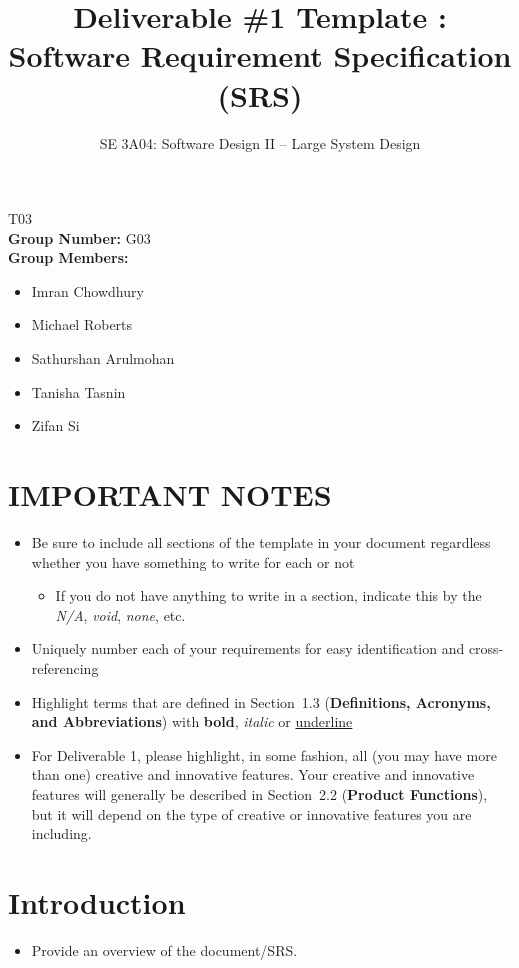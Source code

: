 \documentclass[]{article}
\title{Deliverable \#1 Template : Software Requirement Specification (SRS)}
\author{SE 3A04: Software Design II -- Large System Design}
\date{}
\begin{document}
\maketitle	
{} T03\\
{\bf Group Number:} G03 \\
{\bf Group Members:} 
\begin{itemize}
	\item Imran Chowdhury
	\item Michael Roberts
	\item Sathurshan Arulmohan
	\item Tanisha Tasnin
	\item Zifan Si
\end{itemize}

\section*{IMPORTANT NOTES}
\begin{itemize}
	\item Be sure to include all sections of the template in your document regardless whether you have something to write for each or not
	\begin{itemize}
		\item If you do not have anything to write in a section, indicate this by the \emph{N/A}, \emph{void}, \emph{none}, etc.
	\end{itemize}
	\item Uniquely number each of your requirements for easy identification and cross-referencing
	\item Highlight terms that are defined in Section~1.3 (\textbf{Definitions, Acronyms, and Abbreviations}) with \textbf{bold}, \emph{italic} or \underline{underline}
	\item For Deliverable 1, please highlight, in some fashion, all (you may have more than one) creative and innovative features. Your creative and innovative features will generally be described in Section~2.2 (\textbf{Product Functions}), but it will depend on the type of creative or innovative features you are including.
\end{itemize}

\newpage
\section{Introduction}
\label{sec:introduction}

\begin{itemize}
	\item Provide an overview of the document/SRS.
\end{itemize}
\end{document}
